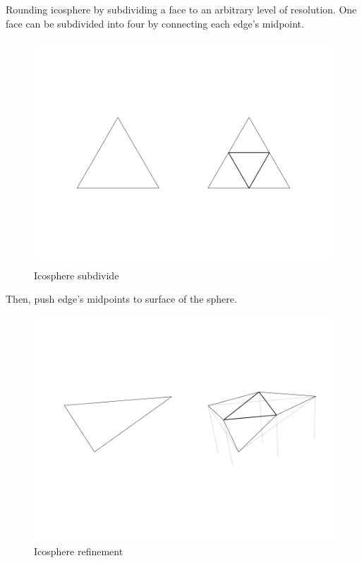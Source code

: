 Rounding icosphere by subdividing a face to an arbitrary level of resolution. One face can be subdivided into four by connecting each edge's midpoint.

\begin{figure}[H]
\centering
\includegraphics[width=\linewidth]{Figures/icosphere-subdivide.png}
\decoRule
\caption[icosphere-subdivide]{Icosphere subdivide}
\end{figure}

Then, push edge's midpoints to surface of the sphere.

\begin{figure}[H]
\centering
\includegraphics[width=\linewidth]{Figures/icosphere-refinement.png}
\decoRule
\caption[icosphere-refinement]{Icosphere refinement}
\end{figure}

